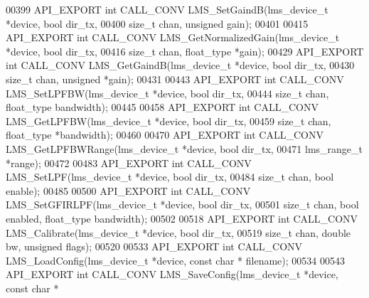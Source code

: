 \begin{DoxyCode}
00399 API_EXPORT \textcolor{keywordtype}{int} CALL_CONV LMS_SetGaindB(lms\_device\_t *device, \textcolor{keywordtype}{bool} dir_tx,
00400                                         \textcolor{keywordtype}{size\_t} chan, \textcolor{keywordtype}{unsigned} gain);
00401 
00415 API_EXPORT \textcolor{keywordtype}{int} CALL_CONV LMS_GetNormalizedGain(lms\_device\_t *device, \textcolor{keywordtype}{bool} dir_tx,
00416                                                 \textcolor{keywordtype}{size\_t} chan, float\_type *gain);
00429 API_EXPORT \textcolor{keywordtype}{int} CALL_CONV LMS_GetGaindB(lms\_device\_t *device, \textcolor{keywordtype}{bool} dir_tx,
00430                                                 \textcolor{keywordtype}{size\_t} chan, \textcolor{keywordtype}{unsigned} *gain);
00431 
00443 API_EXPORT \textcolor{keywordtype}{int} CALL_CONV LMS_SetLPFBW(lms\_device\_t *device, \textcolor{keywordtype}{bool} dir_tx,
00444                                              \textcolor{keywordtype}{size\_t} chan, float\_type bandwidth);
00445 
00458 API_EXPORT \textcolor{keywordtype}{int} CALL_CONV LMS_GetLPFBW(lms\_device\_t *device, \textcolor{keywordtype}{bool} dir_tx,
00459                                             \textcolor{keywordtype}{size\_t} chan, float\_type *bandwidth);
00460 
00470 API_EXPORT \textcolor{keywordtype}{int} CALL_CONV LMS_GetLPFBWRange(lms\_device\_t *device, \textcolor{keywordtype}{bool} dir_tx,
00471                                             lms_range_t *range);
00472 
00483 API_EXPORT \textcolor{keywordtype}{int} CALL_CONV LMS_SetLPF(lms\_device\_t *device, \textcolor{keywordtype}{bool} dir_tx,
00484                                     \textcolor{keywordtype}{size\_t} chan, \textcolor{keywordtype}{bool} enable);
00485 
00500 API_EXPORT \textcolor{keywordtype}{int} CALL_CONV LMS_SetGFIRLPF(lms\_device\_t *device, \textcolor{keywordtype}{bool} dir_tx,
00501                                \textcolor{keywordtype}{size\_t} chan, \textcolor{keywordtype}{bool} enabled, float\_type bandwidth);
00502 
00518 API_EXPORT \textcolor{keywordtype}{int} CALL_CONV LMS_Calibrate(lms\_device\_t *device, \textcolor{keywordtype}{bool} dir_tx,
00519                                         \textcolor{keywordtype}{size\_t} chan, \textcolor{keywordtype}{double} bw, \textcolor{keywordtype}{unsigned} flags);
00520 
00533 API_EXPORT \textcolor{keywordtype}{int} CALL_CONV LMS_LoadConfig(lms\_device\_t *device, \textcolor{keyword}{const} \textcolor{keywordtype}{char} *
      filename);
00534 
00543 API_EXPORT \textcolor{keywordtype}{int} CALL_CONV LMS_SaveConfig(lms\_device\_t *device, \textcolor{keyword}{const} \textcolor{keywordtype}{char} *

\end{DoxyCode}
